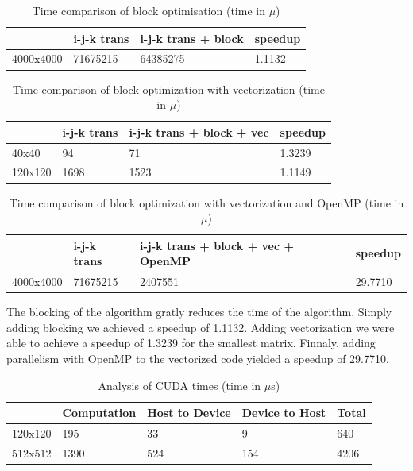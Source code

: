 \documentclass[a4paper]{report}
\begin{document}
\begin{table}[H]
\centering
\begin{tabular}{|l|l|l|l|}
\hline
          & i-j-k trans & i-j-k trans + block & speedup \\ \hline
4000x4000 & 71675215    & 64385275            & 1.1132  \\ \hline
\end{tabular}
\caption{Time comparison of block optimisation (time in $\mu$)}
\end{table}

\begin{table}[H]
\centering
\begin{tabular}{|l|l|l|l|}
\hline
        & i-j-k trans & i-j-k trans + block + vec & speedup \\ \hline
40x40   & 94          & 71                        & 1.3239  \\ \hline
120x120 & 1698        & 1523                      & 1.1149  \\ \hline
\end{tabular}
\caption{Time comparison of block optimization with vectorization (time in
$\mu$)}
\end{table}

\begin{table}[H]
\centering
\begin{tabular}{|l|l|l|l|}
\hline
          & i-j-k trans & i-j-k trans + block + vec + OpenMP & speedup \\ \hline
4000x4000 & 71675215    & 2407551                            & 29.7710 \\ \hline
\end{tabular}
\caption{Time comparison of block optimization with vectorization and OpenMP (time in
$\mu$)}
\end{table}

The blocking of the algorithm gratly reduces the time of the algorithm. Simply
adding blocking we achieved a speedup of 1.1132. Adding vectorization we were
able to achieve a speedup of 1.3239 for the smallest matrix. Finnaly, adding
parallelism with OpenMP to the vectorized code yielded a speedup of 29.7710.

\begin{table}[H]
\centering
\begin{tabular}{|l|l|l|l|l|}
\hline
        & Computation & Host to Device & Device to Host & Total \\ \hline
120x120 & 195         & 33             & 9              & 640   \\ \hline
512x512 & 1390        & 524            & 154            & 4206  \\ \hline
\end{tabular}
\caption{Analysis of CUDA times (time in $\mu$s)}
\end{table}
\end{document}
